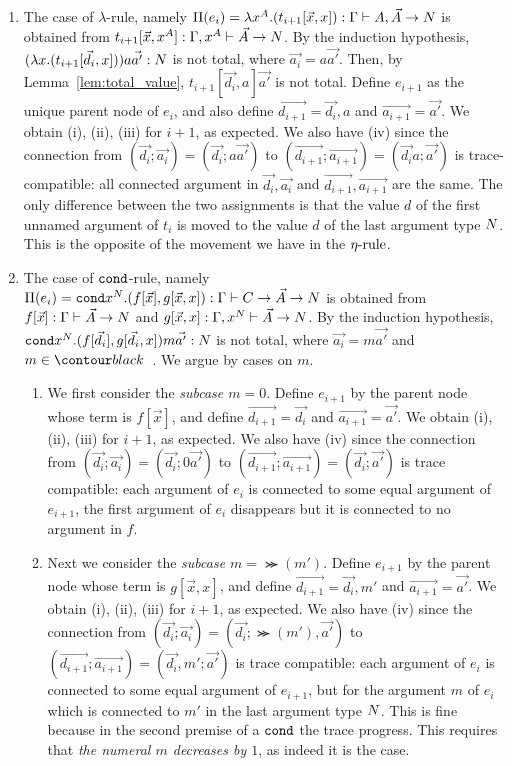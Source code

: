 \documentclass{article}
\newenvironment{proof}[1][Proof]{\begin{trivlist}
\item[\hskip \labelsep {\bfseries #1}]}{\end{trivlist}}
\begin{document}
\begin{proof}
\begin{enumerate}
\item
  The case of $\lambda$-rule, namely
  $\Pi(e_i) = \lambda x^A.(t_{i+1}[\vec{x},x]):
    \Gamma\vdash A, \vec{A} \rightarrow {N}$ is obtained from
  $t_{i+1}[\vec{x},x^A]:\Gamma,x^A\vdash \vec{A}\rightarrow{N}$.
  By the induction hypothesis, $(\lambda x.(t_{i+1}[\vec{d_i},x]))a\vec{a'}:{N}$ is not total,
  where $\vec{a_i} = a\vec{a'}$.
  Then, by Lemma~\ref{lem:total_value}, $t_{i+1}[\vec{d_i},a]\vec{a'}$ is not total. 
  Define $e_{i+1}$ as the unique parent node of $e_i$, and
  also define $\vec{d_{i+1}} = \vec{d_i},a$ and $\vec{a_{i+1}} = \vec{a'}$. 
  We obtain (i), (ii), (iii) for $i+1$, as expected.
  We also have (iv) since the connection from 
  $(\vec{d_i};\vec{a_i}) = (\vec{d_i};a\vec{a'})$ to $(\vec{d_{i+1}};\vec{a_{i+1}}) = (\vec{d_i}a;
    \vec{a'})$ is trace-compatible: all connected argument in $\vec{d_{i}},\vec{a_{i}}$ and 
  $\vec{d_{i+1}},\vec{a_{i+1}}$ are the same. The only difference between the two assignments
  is that the value $d$ of the first unnamed argument of $t_i$ is moved to the value $d$
  of the last argument type ${N}$.
  This is the opposite of the movement we have in the ${\eta\mbox{-rule}}$.

\item  
  The case of ${\tt cond}$-rule, namely
  $\Pi(e_i) = {\tt cond} x^{N}.(f[\vec{x}],g[\vec{x},x]):
    \Gamma\vdash C\rightarrow\vec{A}\rightarrow{N}$
  is obtained from 
  $f[\vec{x}]:\Gamma\vdash \vec{A}\rightarrow{N}$
  and
  $g[\vec{x},x]:\Gamma,x^{N}\vdash \vec{A}\rightarrow{N}$. 
  By the induction hypothesis, ${\tt cond} x^{N}.(f[\vec{d_i}],g[\vec{d_i},x])m\vec{a'}:{N}$ is not total,
  where $\vec{a_i} = m\vec{a'}$ and $m \in \Nat$. We argue by cases on $m$.
\begin{enumerate}
\item
  We first consider the \emph{subcase $m=0$}.
  Define $e_{i+1}$ by the parent node whose term is $f[\vec{x}]$,
  and define $\vec{d_{i+1}} = \vec{d_i}$ and $\vec{a_{i+1}} = \vec{a'}$. 
  We obtain (i), (ii), (iii) for $i+1$, as expected. 
  We also have (iv) since the connection from 
  $(\vec{d_i};\vec{a_i})
 =(\vec{d_i};0\vec{a'})$ to $(\vec{d_{i+1}};\vec{a_{i+1}}) = (\vec{d_i};\vec{a'})$
  is trace compatible: each argument of $e_i$ is connected to some equal argument of $e_{i+1}$,
  the first argument of $e_i$ disappears but it is connected to no argument in $f$.
\item
  Next we consider the \emph{subcase $m=\Succ(m')$}. 
  Define $e_{i+1}$ by the parent node whose term is $g[\vec{x},x]$,
  and define $\vec{d_{i+1}} = \vec{d_i},m'$ and $\vec{a_{i+1}} = \vec{a'}$. 
  We obtain (i), (ii), (iii) for $i+1$, as expected.
  We also have (iv) since the connection from 
  $(\vec{d_i};\vec{a_i})
  =(\vec{d_i};\Succ(m'),\vec{a'})$ to $(\vec{d_{i+1}};\vec{a_{i+1}}) = (\vec{d_i},m';\vec{a'})$
  is trace compatible: each argument of $e_i$ is connected to some equal argument of $e_{i+1}$,
  but for the argument $m$ of $e_i$ which is connected to $m'$ in the last argument type ${N}$.
  This is fine because in the second premise of a ${\tt cond}$ 
  the trace progress. This requires that \emph{the numeral $m$ decreases by $1$}, as indeed it is the case.
\end{enumerate}


\end{enumerate}
\end{proof}
\end{document}
